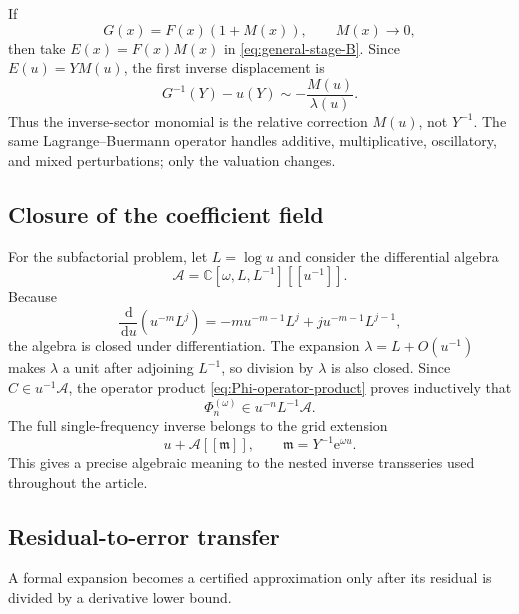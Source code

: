 \documentclass[11pt]{article}
\numberwithin{equation}{section}
\theoremstyle{mainthm}
\theoremstyle{defstyle}
\theoremstyle{remark}
\newcommand{\e}{\mathrm e}
\newcommand{\dd}{\,\mathrm d}
\begin{document}
If
\begin{equation}\label{eq:multiplicative-G}
 G(x)=F(x)\left(1+M(x)\right),
 \qquad M(x)\to0,
\end{equation}
then take \(E(x)=F(x)M(x)\) in \cref{eq:general-stage-B}.  Since \(E(u)=YM(u)\), the first inverse displacement is
\begin{equation}\label{eq:multiplicative-first}
 G^{-1}(Y)-u(Y)
 \sim-\frac{M(u)}{\lambda(u)}.
\end{equation}
Thus the inverse-sector monomial is the relative correction \(M(u)\), not \(Y^{-1}\).  The same Lagrange--Buermann operator handles additive, multiplicative, oscillatory, and mixed perturbations; only the valuation changes.

\subsection{Closure of the coefficient field}

For the subfactorial problem, let \(L=\log u\) and consider the differential algebra
\begin{equation}\label{eq:coefficient-algebra}
 \mathscr A=
 \mathbb C[\omega,L,L^{-1}]\!\left[\!\left[u^{-1}\right]\!\right].
\end{equation}
Because
\[
 \frac{\dd}{\dd u}\left(u^{-m}L^j\right)
 =-m u^{-m-1}L^j+j u^{-m-1}L^{j-1},
\]
the algebra is closed under differentiation.  The expansion \(\lambda=L+O(u^{-1})\) makes \(\lambda\) a unit after adjoining \(L^{-1}\), so division by \(\lambda\) is also closed.  Since \(C\in u^{-1}\mathscr A\), the operator product \cref{eq:Phi-operator-product} proves inductively that
\begin{equation}\label{eq:Phi-algebra}
 \Phi_n^{(\omega)}\in u^{-n}L^{-1}\mathscr A.
\end{equation}
The full single-frequency inverse belongs to the grid extension
\begin{equation}\label{eq:grid-algebra}
 u+\mathscr A[[\mathfrak m]],
 \qquad
 \mathfrak m=Y^{-1}\e^{\omega u}.
\end{equation}
This gives a precise algebraic meaning to the nested inverse transseries used throughout the article.

\subsection{Residual-to-error transfer}

A formal expansion becomes a certified approximation only after its residual is divided by a derivative lower bound.
\end{document}
